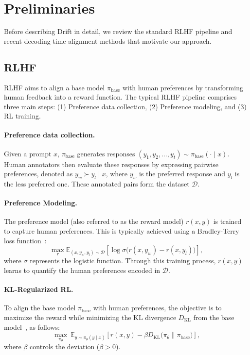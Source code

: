 \section{Preliminaries}

Before describing Drift in detail, we review the standard RLHF pipeline and recent decoding-time alignment methods that motivate our approach.

\subsection{RLHF}

RLHF aims to align a base model $\pi_{\text{base}}$ with human preferences by transforming human feedback into a reward function. The typical RLHF pipeline comprises three main steps: (1) Preference data collection, (2) Preference modeling, and (3) RL training.


\paragraph{Preference data collection.} 
Given a prompt $x$, $\pi_{\text{base}}$ generates responses $(y_1, y_2, \ldots, y_t) \sim \pi_{\text{base}}(\cdot \mid x)$. Human annotators then evaluate these responses by expressing pairwise preferences, denoted as $y_w \succ y_l \mid x$, where $y_w$ is the preferred response and $y_l$ is the less preferred one. These annotated pairs form the dataset $\mathcal{D}$.


\paragraph{Preference Modeling.} The preference model (also referred to as the reward model) $r(x, y)$ is trained to capture human preferences. This is typically achieved using a Bradley-Terry loss function~\citep{bradley1952rank}:
\begin{equation}
    \max_{r} \mathbb{E}_{(x, y_w, y_l) \sim \mathcal{D}} \left[ \log \sigma\big(r(x, y_w) - r(x, y_l)\big) \right],\nonumber
\end{equation}
where $\sigma$ represents the logistic function. Through this training process, $r(x, y)$ learns to quantify the human preferences encoded in $\mathcal{D}$.

\paragraph{KL-Regularized RL.} To align the base model $\pi_{\text{base}}$ with human preferences, the objective is to maximize the reward while minimizing the KL divergence $D_{\text{KL}}$ from the base model~\citep{schulman2017proximal}, as follows:
\begin{equation}
    \max_{\pi_{\theta}} \ \mathbb{E}_{y \sim \pi_{\theta}(y \mid x)} \left[ r(x, y)  - \beta D_{\text{KL}}\big(\pi_{\theta} \| \pi_{\text{base}}\big)\right],\nonumber
\end{equation}
where $\beta$ controls the deviation ($\beta>0$).


